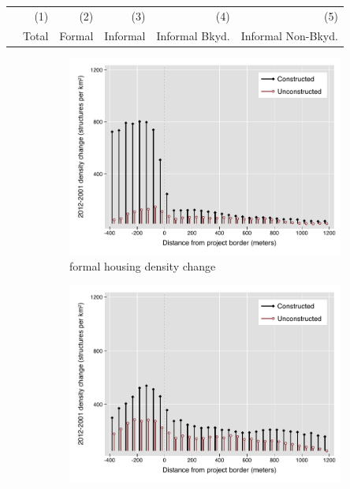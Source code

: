 \documentclass[12pt]{article}
\begin{document}
\begin{table}
\begin{tabular}{lDDDDD}
\toprule
 & \small (1) & \small (2)  & \small (3) & \small (4) & \small (5) \\
 & Total & Formal  & Informal & Informal Bkyd. & Informal Non-Bkyd. \\ \midrule

\bottomrule
\end{tabular}
\end{table}


\begin{figure}[t!]
        \centering
        \caption[ Changes in Housing Densities in Constructed and Unconstructed Projects Areas]
        {\small Housing Densities in Constructed and Unconstructed projects } 
        \begin{subfigure}[b]{0.495\textwidth}   
            \centering 
            \includegraphics[width=\textwidth,trim={0.3cm .3cm 0.1cm 0cm}, clip=true]{figures/bblu_for_rawchanges_4.pdf}
            \caption[]%
            {{\small formal housing density change}}    
            \label{fig:forchange}
        \end{subfigure}
        \hfill
        \begin{subfigure}[b]{0.495\textwidth}   
            \centering 
            \includegraphics[width=\textwidth,trim={0.3cm .3cm 0.1cm 0cm}, clip=true]{figures/bblu_inf_rawchanges_4.pdf}

\end{subfigure}
\end{figure}
\end{document}
